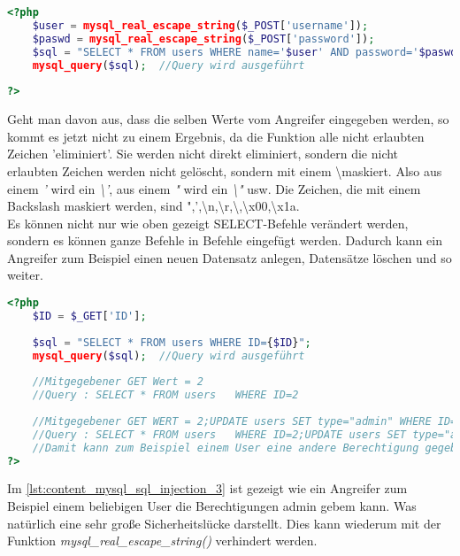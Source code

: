 \begin{lstlisting}[style=custom, language=PHP, caption={MySQL Injection: Richtig},label={lst:content_mysql_sql_injection_2}]
<?php 
	$user = mysql_real_escape_string($_POST['username']);
	$paswd = mysql_real_escape_string($_POST['password']);
	$sql = "SELECT * FROM users WHERE name='$user' AND password='$paswd'";	//Die kontrollierten Werte werden in den Query Übernommen
	mysql_query($sql);	//Query wird ausgeführt
	
?>
\end{lstlisting}
Geht man davon aus, dass die selben Werte vom Angreifer eingegeben werden, so kommt es jetzt nicht zu einem Ergebnis, da die Funktion alle nicht erlaubten Zeichen 'eliminiert'. Sie werden nicht direkt eliminiert, sondern die nicht erlaubten Zeichen werden nicht gelöscht, sondern mit einem \textbackslash maskiert. Also aus einem \textit{'} wird ein \textit{\textbackslash'}, aus einem \textit{"} wird ein \textit{\textbackslash"} usw. Die Zeichen, die mit einem Backslash maskiert werden, sind ",',\textbackslash n,\textbackslash r,\textbackslash,\textbackslash x00,\textbackslash x1a.\\
Es können nicht nur wie oben gezeigt SELECT-Befehle verändert werden, sondern es können ganze Befehle in Befehle eingefügt werden. Dadurch kann ein Angreifer zum Beispiel einen neuen Datensatz anlegen, Datensätze löschen und so weiter.
\begin{lstlisting}[style=custom, language=PHP, caption={MySQL Injection: Beispiel Query in Qeury},label={lst:content_mysql_sql_injection_3}]
<?php 
	$ID = $_GET['ID'];
	
	$sql = "SELECT * FROM users	WHERE ID={$ID}";
	mysql_query($sql);	//Query wird ausgeführt
	
	//Mitgegebener GET Wert = 2
	//Query : SELECT * FROM users	WHERE ID=2
	
	//Mitgegebener GET WERT = 2;UPDATE users SET type="admin" WHERE ID=23
	//Query : SELECT * FROM users	WHERE ID=2;UPDATE users SET type="admin" WHERE ID=23
	//Damit kann zum Beispiel einem User eine andere Berechtigung gegeben werden
?>
\end{lstlisting}
Im \autoref{lst:content_mysql_sql_injection_3} ist gezeigt wie ein Angreifer zum Beispiel einem beliebigen User die Berechtigungen admin gebem kann. Was natürlich eine sehr große Sicherheitslücke darstellt. Dies kann wiederum mit der Funktion \textit{mysql\_real\_escape\_string()} verhindert werden.